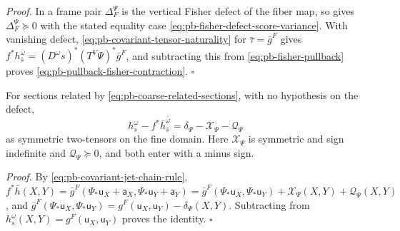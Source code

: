 \noindent\emph{Proof.}
In a frame pair \(\Delta_F^\Psi\) is the vertical Fisher defect of the fiber map, so
 gives \(\Delta_F^\Psi\succeq0\) with the stated equality case
\eqref{eq:pb-fisher-defect-score-variance}. With vanishing defect,
\eqref{eq:pb-covariant-tensor-naturality} for \(\bar\tau=\bar g^F\) gives
\(f^*h_{\bar s}^{\bar\omega}=(D^\omega s)^*(T^V\Psi)^*\bar g^F\), and subtracting this from
\eqref{eq:pb-fisher-pullback} proves \eqref{eq:pb-pullback-fisher-contraction}. \hfill$\square$

For sections related by \eqref{eq:pb-coarse-related-sections}, with no hypothesis on the defect,
\begin{equation}
h_s^\omega-f^*\bar h_{\bar s}^{\bar\omega}
=\delta_\Psi-\mathcal X_\Psi-\mathcal Q_\Psi
\label{eq:pb-signed-base-comparison}
\end{equation}
as symmetric two-tensors on the fine domain. Here \(\mathcal X_\Psi\) is symmetric and sign
indefinite and \(\mathcal Q_\Psi\succeq0\), and both enter with a minus sign. 

\noindent\emph{Proof.}
By \eqref{eq:pb-covariant-jet-chain-rule},
\(f^*\bar h(X,Y)=\bar g^F(\Psi_*\mathsf u_X+\mathsf a_X,\Psi_*\mathsf u_Y+\mathsf a_Y)
=\bar g^F(\Psi_*\mathsf u_X,\Psi_*\mathsf u_Y)+\mathcal X_\Psi(X,Y)+\mathcal Q_\Psi(X,Y)\), and
\(\bar g^F(\Psi_*\mathsf u_X,\Psi_*\mathsf u_Y)=g^F(\mathsf u_X,\mathsf u_Y)-\delta_\Psi(X,Y)\).
Subtracting from \(h_s^\omega(X,Y)=g^F(\mathsf u_X,\mathsf u_Y)\) proves the identity.
\hfill$\square$


